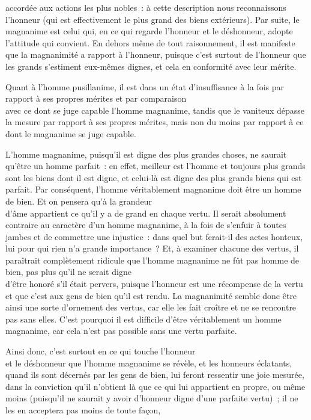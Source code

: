 \documentclass[french,twoside]{book} %
\begin{document}
accordée aux actions les plus nobles : à cette description nous reconnaissons l’honneur (qui est effectivement le plus grand des biens extérieurs). Par suite, le magnanime est celui qui, en ce qui regarde l’honneur et le déshonneur, adopte l’attitude qui convient. En dehors même de tout raisonnement, il est manifeste que la magnanimité a rapport à l’honneur, puisque c’est surtout de l’honneur que les grands s’estiment eux-mêmes dignes, et cela en conformité avec leur mérite.\par
Quant à l’homme pusillanime, il est dans un état d’insuffisance à la fois par rapport à ses propres mérites et par comparaison \\
avec ce dont se juge capable l’homme magnanime, tandis que le vaniteux dépasse la mesure par rapport à ses propres mérites, mais non du moins par rapport à ce dont le magnanime se juge capable.\par
L’homme magnanime, puisqu’il est digne des plus grandes choses, ne saurait qu’être un homme parfait : en effet, meilleur est l’homme et toujours plus grands sont les biens dont il est digne, et celui-là est digne des plus grands biens qui est parfait. Par conséquent, l’homme véritablement magnanime doit être un homme de bien. Et on pensera qu’à la grandeur \\
d’âme appartient ce qu’il y a de grand en chaque vertu. Il serait absolument contraire au caractère d’un homme magnanime, à la fois de s’enfuir à toutes jambes et de commettre une injustice : dans quel but ferait-il des actes honteux, lui pour qui rien n’a grande importance ? Et, à examiner chacune des vertus, il paraîtrait complètement ridicule que l’homme magnanime ne fût pas homme de bien, pas plus qu’il ne serait digne \\
d’être honoré s’il était pervers, puisque l’honneur est une récompense de la vertu et que c’est aux gens de bien qu’il est  rendu. La magnanimité semble donc être ainsi une sorte d’ornement des vertus, car elle les fait croître et ne se rencontre pas sans elles. C’est pourquoi il est difficile d’être véritablement un homme magnanime, car cela n’est pas possible sans une vertu parfaite.\par
Ainsi donc, c’est surtout en ce qui touche l’honneur \\
et le déshonneur que l’homme magnanime se révèle, et les honneurs éclatants, quand ils sont décernés par les gens de bien, lui feront ressentir une joie mesurée, dans la conviction qu’il n’obtient là que ce qui lui appartient en propre, ou même moins (puisqu’il ne saurait y avoir d’honneur digne d’une parfaite vertu) ; il ne les en acceptera pas moins de toute façon, \\
\end{document}
